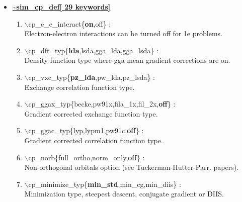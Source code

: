 \begin{itemize}
\begin{enumerate}
\end{enumerate}

\clearpage
\huge
\item[] \underline{\bf \~{}sim\_cp\_def[ 29 keywords]}
\begin{enumerate}

 \vspace{0.15in} \Large
 \item  $\backslash$cp\_e\_e\_interact\{{\bf on},off\} : \\
    \large
     Electron-electron interactions can be turned off for 1e problems.

 \vspace{0.15in} \Large
 \item  $\backslash$cp\_dft\_typ\{{\bf lda},lsda,gga\_lda,gga\_lsda\} : \\
    \large
     Density function type where gga mean gradient corrections are on.

 \vspace{0.15in} \Large
 \item  $\backslash$cp\_vxc\_typ\{{\bf pz\_lda},pw\_lda,pz\_lsda\} : \\
    \large
     Exchange correlation function type.

 \vspace{0.15in} \Large
 \item  $\backslash$cp\_ggax\_typ\{becke,pw91x,fila\_1x,fil\_2x,{\bf off}\} : \\
    \large
     Gradient corrected exchange function type.

 \vspace{0.15in} \Large
 \item  $\backslash$cp\_ggac\_typ\{lyp,lypm1,pw91c,{\bf off}\} : \\
    \large
     Gradient corrected correlation function type.

 \vspace{0.15in} \Large
 \item  $\backslash$cp\_norb\{full\_ortho,norm\_only,{\bf off}\} : \\
    \large
     Non-orthogonal orbitals option (see Tuckerman-Hutter-Parr. papers).

 \vspace{0.15in} \Large
 \item  $\backslash$cp\_minimize\_typ\{{\bf min\_std},min\_cg,min\_diis\} : \\
    \large
      Minimization type, steepest descent, conjugate gradient or DIIS.


\end{enumerate}
\end{itemize}

